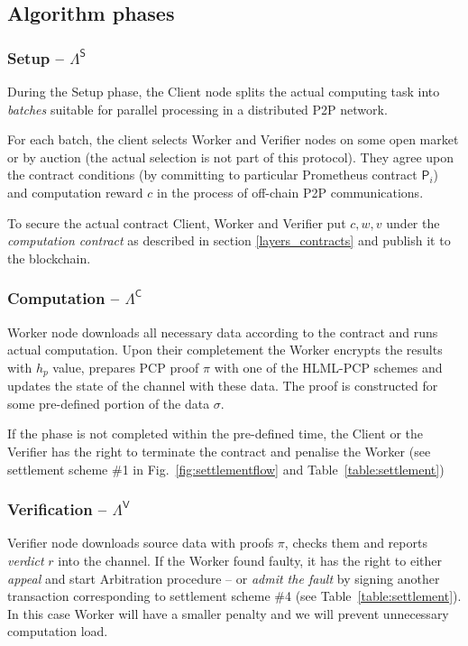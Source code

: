 \documentclass[a4paper]{article}
\begin{document}
\subsection{Algorithm phases}
\label{phases}

\subsubsection{Setup -- $\Lambda^\mathsf{S}$}
During the Setup phase, the Client node splits the actual computing task into \textit{batches} suitable for parallel processing in a distributed P2P network.

For each batch, the client selects Worker and Verifier nodes on some open market or by auction (the actual selection is not part of this protocol). They agree upon the contract conditions (by committing to particular Prometheus contract $\mathsf{P}_i$) and computation reward $c$ in the process of off-chain P2P communications. 

To secure the actual contract Client, Worker and Verifier put $c, w, v$ under the \textit{computation contract} as described in section \ref{layers_contracts} and publish it to the blockchain.

\subsubsection{Computation -- $\Lambda^\mathsf{C}$}
Worker node downloads all necessary data according to the contract and runs actual computation. Upon their completement the Worker encrypts the results with $h_p$ value, prepares PCP proof $\pi$ with one of the HLML-PCP schemes and updates the state of the channel with these data. The proof is constructed for some pre-defined portion of the data $\sigma$.

If the phase is not completed within the pre-defined time, the Client or the Verifier has the right to terminate the contract and penalise the Worker (see settlement scheme \#1 in Fig.~\ref{fig:settlementflow} and Table~\ref{table:settlement})

\subsubsection{Verification -- $\Lambda^\mathsf{V}$}
Verifier node downloads source data with proofs $\pi$, checks them and reports \textit{verdict} $r$ into the channel. If the Worker found faulty, it has the right to either \textit{appeal} and start Arbitration procedure -- or \textit{admit the fault} by signing another transaction corresponding to settlement scheme \#4 (see Table~\ref{table:settlement}). In this case Worker will have a smaller penalty and we will prevent unnecessary computation load.
\end{document}
